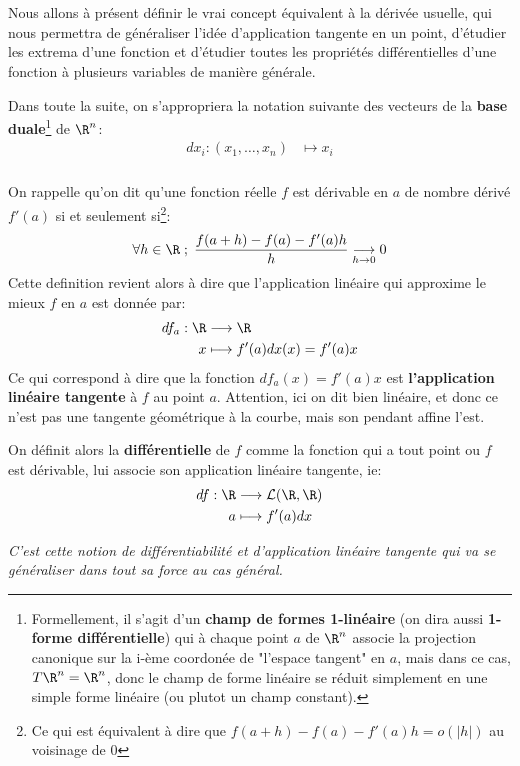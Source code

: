 \chapter*{}
Nous allons à présent définir le vrai concept équivalent à la dérivée usuelle, qui nous permettra de généraliser l'idée d'application tangente en un point, d'étudier les extrema d'une fonction et d'étudier toutes les propriétés différentielles d'une fonction à plusieurs variables de manière générale.\<

Dans toute la suite, on s'appropriera la notation suivante des vecteurs de la \textbf{base duale}\footnote[1]{Formellement, il s'agit d'un \textbf{champ de formes 1-linéaire} (on dira aussi \textbf{1-forme différentielle}) qui à chaque point \(a\) de \(\R^n\) associe la projection canonique sur la i-ème coordonée de "l'espace tangent" en \(a\), mais dans ce cas, \(T\R^n = \R^n\), donc le champ de forme linéaire se réduit simplement en une simple forme linéaire (ou plutot un champ constant).} de \(\R^n\):
\[
   \begin{aligned}
      dx_i : (x_1, \ldots, x_n) &\longmapsto x_i 
   \end{aligned}
\]
\subsection*{}
On rappelle qu'on dit qu'une fonction réelle \(f\) est dérivable en \(a\) de nombre dérivé \(f'(a)\) si et seulement si\footnote[2]{Ce qui est équivalent à dire que \(f(a + h) - f(a) - f'(a)h = o(|h|)\) au voisinage de \(0\)}:
\[
   \forall h \in \R \; ; \; \frac{f(a + h) - f(a) - f'(a)h}{h} \underset{h \rightarrow 0}{\longrightarrow} 0
\]
Cette definition revient alors à dire que l'application linéaire qui approxime le mieux \(f\) en \(a\) est donnée par:
\[
   \begin{aligned}
      df_a : \R &\longrightarrow \R\\
      x &\longmapsto f'(a)dx(x) = f'(a)x 
   \end{aligned}  
\]
Ce qui correspond à dire que la fonction \(df_a(x) = f'(a)x\) est \textbf{l'application linéaire tangente} à \(f\) au point \(a\). Attention, ici on dit bien linéaire, et donc ce n'est pas une tangente géométrique à la courbe, mais son pendant affine l'est.\<

On définit alors la \textbf{différentielle} de \(f\) comme la fonction qui a tout point ou \(f\) est dérivable, lui associe son application linéaire tangente, ie:
\[
   \begin{aligned}
      df : \R &\longrightarrow \mathcal{L(\R, \R)}\\
      a &\longmapsto f'(a)dx
   \end{aligned}  
\]
\begin{center}
   \textit{C'est cette notion de différentiabilité et d'application linéaire tangente qui va se généraliser dans tout sa force au cas général.}
\end{center}
